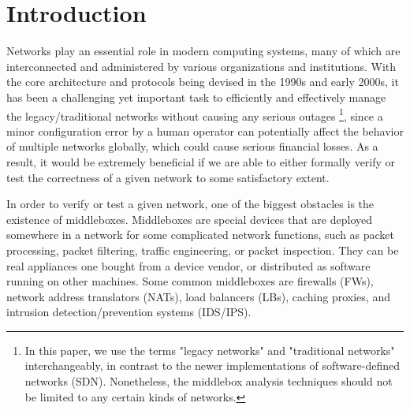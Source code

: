 
\section{Introduction}

Networks play an essential role in modern computing systems, many of which are
interconnected and administered by various organizations and institutions. With
the core architecture and protocols being devised in the 1990s and early 2000s,
it has been a challenging yet important task to efficiently and effectively
manage the legacy/traditional networks without causing any serious outages
\footnote{In this paper, we use the terms "legacy networks" and "traditional
networks" interchangeably, in contrast to the newer implementations of
software-defined networks (SDN). Nonetheless, the middlebox analysis techniques
should not be limited to any certain kinds of networks.},
since a minor configuration error by a human operator can potentially affect the
behavior of multiple networks globally, which could cause serious financial
losses. As a result, it would be extremely beneficial if we are able to either
formally verify or test the correctness of a given network to some satisfactory
extent.

In order to verify or test a given network, one of the biggest obstacles is the
existence of middleboxes. Middleboxes are special devices that are deployed
somewhere in a network for some complicated network functions, such as packet
processing, packet filtering, traffic engineering, or packet inspection. They
can be real appliances one bought from a device vendor, or distributed as
software running on other machines. Some common middleboxes are firewalls (FWs),
network address translators (NATs), load balancers (LBs), caching proxies, and
intrusion detection/prevention systems (IDS/IPS).

